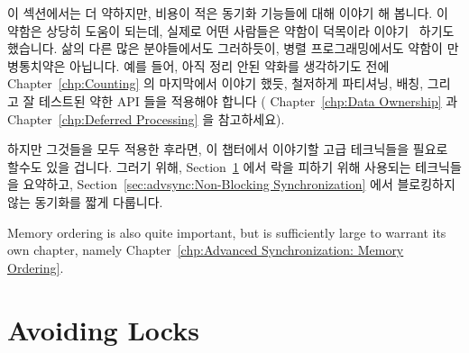 
%

이 섹션에서는 더 약하지만, 비용이 적은 동기화 기능들에 대해 이야기 해 봅니다.
이 약함은 상당히 도움이 되는데, 실제로 어떤 사람들은 약함이 덕목이라
이야기~\cite{JadeAlglave2013-WeaknessIsVirtue} 하기도 했습니다.
삶의 다른 많은 분야들에서도 그러하듯이, 병렬 프로그래밍에서도 약함이
만병통치약은 아닙니다.
예를 들어, 아직 정리 안된 약화를 생각하기도 전에 Chapter~\ref{chp:Counting} 의
마지막에서 이야기 했듯, 철저하게 파티셔닝, 배칭, 그리고 잘 테스트된 약한 API
들을 적용해야 합니다 ( Chapter~\ref{chp:Data Ownership} 과
Chapter~\ref{chp:Deferred Processing} 을 참고하세요).

하지만 그것들을 모두 적용한 후라면, 이 챕터에서 이야기할 고급 테크닉들을 필요로
할수도 있을 겁니다.
그러기 위해, Section~\ref{sec:advsync:Avoiding Locks} 에서 락을 피하기 위해
사용되는 테크닉들을 요약하고,
Section~\ref{sec:advsync:Non-Blocking Synchronization} 에서 블로킹하지 않는
동기화를 짧게 다룹니다.
\iffalse

This chapter discusses a number of ways of using weaker, and hopefully
lower-cost, synchronization primitives.
This weakening can be quite helpful, in fact, some have argued
that weakness is a virtue~\cite{JadeAlglave2013-WeaknessIsVirtue}.
Nevertheless, in parallel programming, as in many other aspects
of life, weakness is not a panacea.
For example, as noted at the end of
Chapter~\ref{chp:Counting},
you should thoroughly apply partitioning, batching, and
well-tested packaged weak APIs (see Chapter~\ref{chp:Data Ownership}
and~\ref{chp:Deferred Processing})
before even thinking about unstructured weakening.

But after doing all that, you still might find yourself needing the
advanced techniques described in this chapter.
To that end,
Section~\ref{sec:advsync:Avoiding Locks}
summarizes techniques used thus far for avoiding locks and
Section~\ref{sec:advsync:Non-Blocking Synchronization}
gives a brief overview of non-blocking synchronization.
\fi
Memory ordering is also quite important, but is sufficiently large
to warrant its own chapter, namely
Chapter~\ref{chp:Advanced Synchronization: Memory Ordering}.

\section{Avoiding Locks}
\label{sec:advsync:Avoiding Locks}

